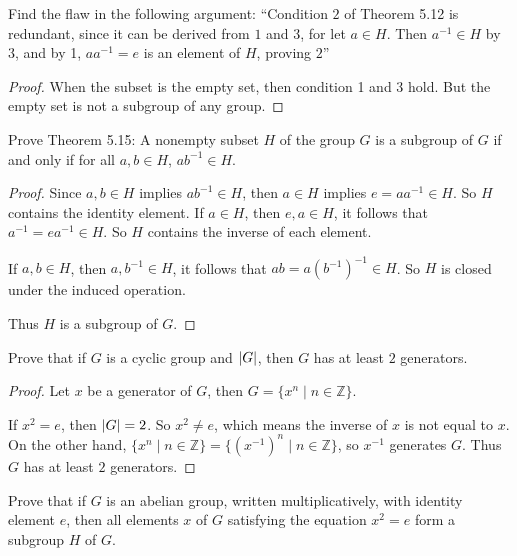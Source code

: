 \newpage
\begin{exercise}
    Find the flaw in the following argument: ``Condition $2$ of Theorem 5.12 is redundant, since it can be derived from $1$ and $3$, for let $a\in H$. Then $a^{-1}\in H$ by 3, and by 1, $aa^{-1} = e$ is an element of $H$, proving $2$''
\end{exercise}

\begin{proof}
    When the subset is the empty set, then condition 1 and 3 hold. But the empty set is not a subgroup of any group.
\end{proof}

\newpage
\begin{exercise}
    Prove Theorem 5.15: A nonempty subset $H$ of the group $G$ is a subgroup of $G$ if and only if for all $a, b\in H$, $ab^{-1}\in H$.
\end{exercise}

\begin{proof}
    Since $a, b\in H$ implies $ab^{-1}\in H$, then $a\in H$ implies $e = aa^{-1}\in H$. So $H$ contains the identity element. If $a\in H$, then $e, a\in H$, it follows that $a^{-1} = ea^{-1}\in H$. So $H$ contains the inverse of each element.

    If $a, b\in H$, then $a, b^{-1}\in H$, it follows that $ab = a{(b^{-1})}^{-1} \in H$. So $H$ is closed under the induced operation.

    Thus $H$ is a subgroup of $G$.
\end{proof}

\newpage
\begin{exercise}
    Prove that if $G$ is a cyclic group and $\left\vert{G}\right\vert$, then $G$ has at least $2$ generators.
\end{exercise}

\begin{proof}
    Let $x$ be a generator of $G$, then $G = \{ x^{n} \mid n\in\mathbb{Z} \}$.

    If $x^{2} = e$, then $\left\vert{G}\right\vert = 2$. So $x^{2} \ne e$, which means the inverse of $x$ is not equal to $x$. On the other hand, $\{ x^{n} \mid n\in\mathbb{Z} \} = \{ {(x^{-1})}^{n} \mid n\in\mathbb{Z} \}$, so $x^{-1}$ generates $G$. Thus $G$ has at least $2$ generators.
\end{proof}

\newpage
\begin{exercise}
    Prove that if $G$ is an abelian group, written multiplicatively, with identity element $e$, then all elements $x$ of $G$ satisfying the equation $x^{2} = e$ form a subgroup $H$ of $G$.
\end{exercise}

